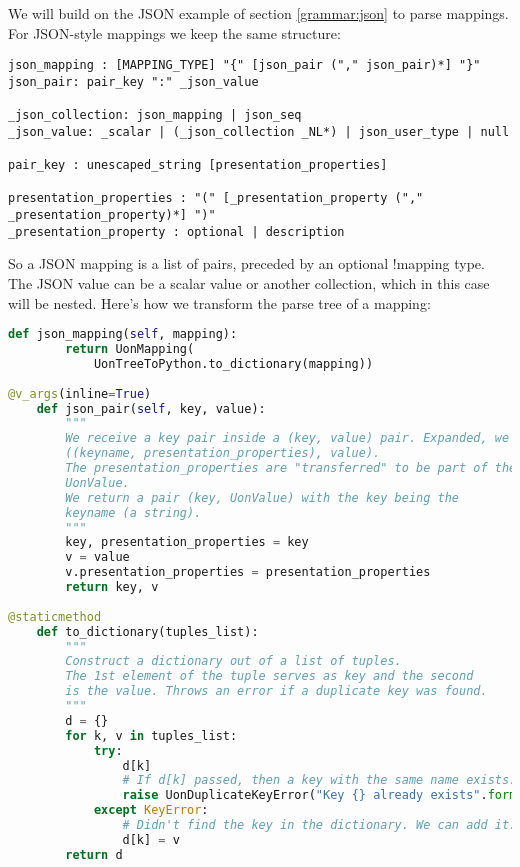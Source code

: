 \documentclass[12pt]{article}
\begin{document}
We will build on the JSON example of section \ref{grammar:json} to parse mappings. For JSON-style mappings we keep the same structure:
\begin{lstlisting}[label=grammar:uon_json]
json_mapping : [MAPPING_TYPE] "{" [json_pair ("," json_pair)*] "}"
json_pair: pair_key ":" _json_value

_json_collection: json_mapping | json_seq
_json_value: _scalar | (_json_collection _NL*) | json_user_type | null

pair_key : unescaped_string [presentation_properties]

presentation_properties : "(" [_presentation_property ("," _presentation_property)*] ")"
_presentation_property : optional | description
\end{lstlisting}
So a JSON mapping is a list of pairs, preceded by an optional !mapping type. The JSON value can be a scalar value or another collection, which in this case will be nested. Here's how we transform the parse tree of a mapping:

\begin{lstlisting}[language=Python, label=grammar:mapping]
def json_mapping(self, mapping):
        return UonMapping(
            UonTreeToPython.to_dictionary(mapping))
            
@v_args(inline=True)
    def json_pair(self, key, value):
        """
        We receive a key pair inside a (key, value) pair. Expanded, we have
        ((keyname, presentation_properties), value).
        The presentation_properties are "transferred" to be part of the
        UonValue.
        We return a pair (key, UonValue) with the key being the 
        keyname (a string).
        """
        key, presentation_properties = key
        v = value
        v.presentation_properties = presentation_properties
        return key, v
        
@staticmethod
    def to_dictionary(tuples_list):
        """
        Construct a dictionary out of a list of tuples.
        The 1st element of the tuple serves as key and the second
        is the value. Throws an error if a duplicate key was found.
        """
        d = {}
        for k, v in tuples_list:
            try:
                d[k]
                # If d[k] passed, then a key with the same name exists.
                raise UonDuplicateKeyError("Key {} already exists".format(k))
            except KeyError:
                # Didn't find the key in the dictionary. We can add it.
                d[k] = v
        return d
\end{lstlisting}
\end{document}
